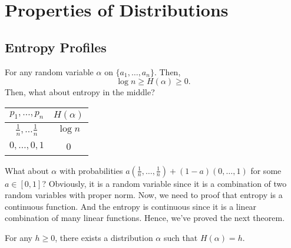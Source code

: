 
\section{Properties of Distributions}

\subsection{Entropy Profiles}

For any random variable $\alpha$ on $\{a_1, \ldots, a_n\} $.
Then,
\[
\log n \ge H(\alpha) \ge 0.
\] 
Then, what about entropy in the middle?

\begin{center}
\begin{tabular}{c|c}
	$p_1, \ldots, p_n$ & $H(\alpha)$ \\
	\hline
	$\frac{1}{n}, \ldots \frac{1}{n}$ & $\log n$ \\
	$0, \ldots, 0, 1$ & 0 \\
\end{tabular}
\end{center}

What about $\alpha$ with probabilities $a(\frac{1}{n}, \ldots, \frac{1}{n}) + (1 - a) (0, \ldots, 1)$ for some $a \in [0, 1]$?
Obviously, it is a random variable since it is a combination of two random variables with proper norm.
Now, we need to proof that entropy is a continuous function.
And the entropy is continuous since it is a linear combination of many linear functions.
Hence, we've proved the next theorem.

\begin{theorem}
	For any $h \ge  0$, there exists a distribution $\alpha$ such that $H(\alpha) = h$.
\end{theorem}

